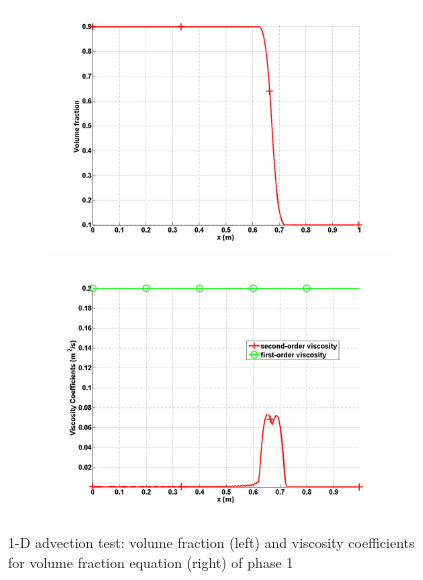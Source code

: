 \begin{figure}[H]
        \centering
        \begin{subfigure}[b]{0.495\textwidth}
                \centering
                \includegraphics[width=\textwidth]{figures/SEM/liquid_volume_fraction.png}
                \caption{\label{fig:vf-liq-7-eqn-sect4}}
        \end{subfigure}%
        \begin{subfigure}[b]{0.495\textwidth}
                \centering
                \includegraphics[width=\textwidth]{figures/SEM/liquid_beta.png}
                \caption{\label{fig:beta-liq-7-eqn-sect4}}
        \end{subfigure}
        \caption{1-D advection test: volume fraction (left) and viscosity coefficients for volume fraction equation (right) of phase 1\label{fig:beta-visc-7-sect4}}
\end{figure}
